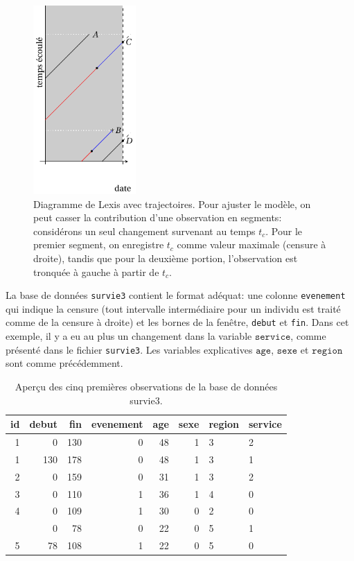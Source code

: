 \documentclass[
  11pt,
  letterpaper,
]{scrbook}
\theoremstyle{definition}
\theoremstyle{remark}
\begin{document}
\begin{figure}[ht!]

{\centering \includegraphics[width=0.35\textwidth,height=\textheight]{./figures/Lexis_censure_modif.pdf}

}

\caption{\label{fig-lexischtemps}Diagramme de Lexis avec trajectoires.
Pour ajuster le modèle, on peut casser la contribution d'une observation
en segments: considérons un seul changement survenant au temps \(t_c\).
Pour le premier segment, on enregistre \(t_c\) comme valeur maximale
(censure à droite), tandis que pour la deuxième portion, l'observation
est tronquée à gauche à partir de \(t_c\).}

\end{figure}

La base de données \texttt{survie3} contient le format adéquat: une
colonne \texttt{evenement} qui indique la censure (tout intervalle
intermédiaire pour un individu est traité comme de la censure à droite)
et les bornes de la fenêtre, \texttt{debut} et \texttt{fin}. Dans cet
exemple, il y a eu au plus un changement dans la variable
\(\texttt{service}\), comme présenté dans le fichier \texttt{survie3}.
Les variables explicatives \(\texttt{age}\), \(\texttt{sexe}\) et
\(\texttt{region}\) sont comme précédemment.

\hypertarget{tbl-survie3-donnees}{}
\begin{table}
\caption{\label{tbl-survie3-donnees}Aperçu des cinq premières observations de la base de données survie3. }\tabularnewline

\centering
\begin{tabular}{rrrrrrll}
\toprule
id & debut & fin & evenement & age & sexe & region & service\\
\midrule
1 & 0 & 130 & 0 & 48 & 1 & 3 & 2\\
1 & 130 & 178 & 0 & 48 & 1 & 3 & 1\\
2 & 0 & 159 & 0 & 31 & 1 & 3 & 2\\
3 & 0 & 110 & 1 & 36 & 1 & 4 & 0\\
4 & 0 & 109 & 1 & 30 & 0 & 2 & 0\\
\addlinespace
5 & 0 & 78 & 0 & 22 & 0 & 5 & 1\\
5 & 78 & 108 & 1 & 22 & 0 & 5 & 0\\
\bottomrule
\end{tabular}
\end{table}
\end{document}
